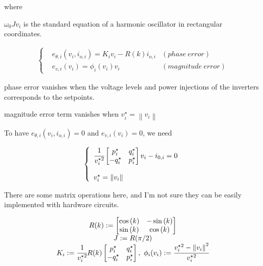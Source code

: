 where

$\omega_0Jv_i$ is the standard equation of a harmonic oscillator in rectangular coordinates.

\begin{equation}
\begin{aligned}
\left\{\begin{matrix}
    &e_{\theta,i}(v_i,i_{o,i})=K_iv_i-R(k)i_{o,i} &(phase\ error)\\
    &e_{v,i}(v_i)=\phi_i(v_i)v_i &(magnitude\ error)
\end{matrix}\right.
\end{aligned}
\end{equation}

phase error vanishes when the voltage levels and power injections of the inverters corresponds to the setpoints.

magnitude error term vanishes when $v_i^{\star}=\left\|v_i \right\|$

To have $e_{\theta,i}(v_i,i_{o,i})=0$ and $e_{v,i}(v_i)=0$, we need

\begin{equation}
\begin{aligned}
\left\{\begin{array}{l}
    \cfrac{1}{v_i^{\star2}}\begin{bmatrix}
        p_i^\star & q_i^\star\\
        -q_i^\star & p_i^\star
    \end{bmatrix}v_i-i_{0,i}=0\\\\
    v_i^{\star}=\left\|v_i \right\|
\end{array}\right.
\end{aligned}
\end{equation}


There are some matrix operations here, and I'm not sure they can be easily implemented with hardware circuits.

\begin{equation}
\begin{aligned}
\begin{matrix}
   R(k):=
\begin{bmatrix}
    \cos{(k)} & -\sin{(k)}\\
    \sin{(k)} & \cos{(k)}
\end{bmatrix}\\
J:=R(\pi/2)\\
K_i:=\cfrac{1}{v_i^{\star2}}R(k)\begin{bmatrix}
p_i^\star & q_i^\star\\
-q_i^\star & p_i^\star
\end{bmatrix},\ \phi_i(v_i):=\cfrac{v_i^{\star2}-\left\|v_i \right\|^2}{v_i^{\star2}}
\end{matrix}
\end{aligned}
\end{equation}